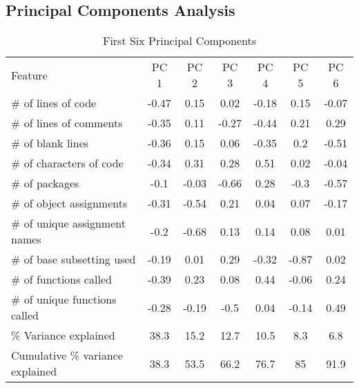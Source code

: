 \documentclass[12pt]{article}\usepackage[]{graphicx}\usepackage[]{color}
\begin{document}
\subsection{Principal Components Analysis}





\begin{table}[H]
\begin{tabular}{lcccccc} \toprule
Feature                                                 & PC 1 &  PC 2 & PC 3 & PC 4 & PC 5 & PC 6 \\ \cmidrule(lr){2-7}
\# of lines of code           &  -0.47 &  0.15 &  0.02 &  -0.18 &  0.15 &  -0.07                \\
\# of lines of comments       &  -0.35 &  0.11 &  -0.27 &  -0.44 &  0.21 &  0.29                \\
\# of blank lines             &  -0.36 &  0.15 &  0.06 &  -0.35 &  0.2 &  -0.51                \\
\# of characters of code      &  -0.34 &  0.31 &  0.28 &  0.51 &  0.02 &  -0.04                \\
\# of packages         &  -0.1 &  -0.03 &  -0.66 &  0.28 &  -0.3 &  -0.57                \\
\# of object assignments      &  -0.31 &  -0.54 &  0.21 &  0.04 &  0.07 &  -0.17                \\
\# of unique assignment names &  -0.2 &  -0.68 &  0.13 &  0.14 &  0.08 &  0.01                \\
\# of base subsetting used    &  -0.19 &  0.01 &  0.29 &  -0.32 &  -0.87 &  0.02                \\
\# of functions called        &  -0.39 &  0.23 &  0.08 &  0.44 &  -0.06 &  0.24                \\
\# of unique functions called &  -0.28 &  -0.19 &  -0.5 &  0.04 &  -0.14 &  0.49                \\ \midrule
\% Variance explained            &  38.3  &  15.2  &  12.7  &  10.5  &  8.3  &  6.8                 \\
Cumulative \% variance explained &  38.3 &  53.5  &  66.2  &  76.7  &  85  &  91.9     \\ \bottomrule
\end{tabular}
\caption{First Six Principal Components}
\end{table}

% 
\end{document}
